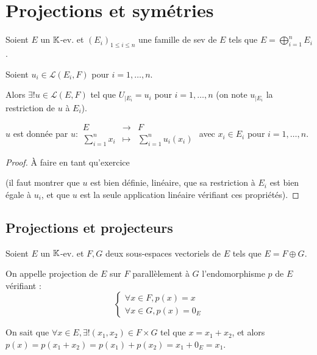 \documentclass[12pt, a4paper]{report}
\begin{document}
\chapter{Projections et symétries}

\begin{property}
    Soient $E$ un $\mathbb{K}$-ev. et $(E_i)_{1\le i \le n}$ une famille de sev de $E$ tels que $E = \bigoplus_{i=1}^n E_i$.

    Soient $u_i \in \mathcal L(E_i,F)$ pour $i=1,\dots,n$.

    Alors $\exists! u \in \mathcal L(E,F)$ tel que $U_{|E_i} = u_i$ pour $i=1,\dots,n$ (on note $u_{|E_i}$ la restriction de $u$ à $E_i$).

    $u$ est donnée par $u : \begin{matrix}
    E &\to &F\\
    \sum_{i=1}^n x_i &\mapsto &\sum_{i=1}^n u_i(x_i)
    \end{matrix}$ avec $x_i \in E_i$ pour $i=1,\dots,n$.
\end{property}

\begin{proof}
    À faire en tant qu'exercice

    (il faut montrer que $u$ est bien définie, linéaire, que sa restriction à $E_i$ est bien égale à $u_i$, et que $u$ est la seule application linéaire vérifiant ces propriétés).
\end{proof}

\section{Projections et projecteurs}

\begin{definition}[Projection]
    Soient $E$ un $\mathbb{K}$-ev. et $F,G$ deux sous-espaces vectoriels de $E$ tels que $E = F \oplus G$.

    On appelle projection de $E$ sur $F$ parallèlement à $G$ l'endomorphisme $p$ de $E$ vérifiant :
    $$\begin{cases}
    \forall x \in F, p(x) = x\\
    \forall x \in G, p(x) = 0_E
    \end{cases}$$
\end{definition}

\begin{remark}
    On sait que $\forall x \in E, \exists! (x_1,x_2) \in F \times G$ tel que $x = x_1 + x_2$, et alors $p(x) = p(x_1 + x_2) = p(x_1) + p(x_2) = x_1 + 0_E = x_1$.
\end{remark}
\end{document}

